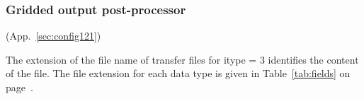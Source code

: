 \vsssub
\subsubsection{Gridded output post-processor} \label{sec:ww3outf}
\vsssub

 (App.~\ref{sec:config121})

\vspace{\baselineskip} 
\noindent
The extension of the file name of transfer files for {\F itype = 3} identifies
the content of the file. The file extension for each data type is given in
Table~\ref{tab:fields} on page~\pageref{tab:fields}.

\pb
